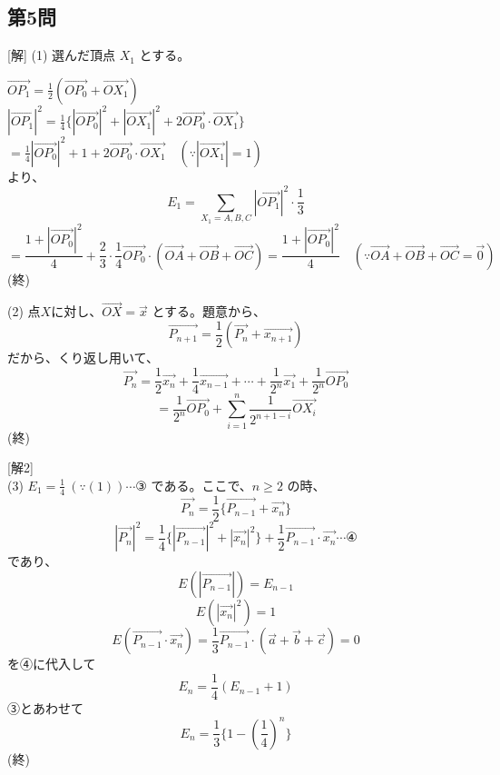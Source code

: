 \documentclass[../main.tex]{subfiles}
\begin{document}
\subsection*{第5問}
[解] (1) 選んだ頂点 $X_1$ とする。

\begin{center}
\end{center}

$\overrightarrow{OP_1} = \frac{1}{2}(\overrightarrow{OP_0} + \overrightarrow{OX_1})$ \\
$|\overrightarrow{OP_1}|^2 = \frac{1}{4}\{|\overrightarrow{OP_0}|^2 + |\overrightarrow{OX_1}|^2 + 2\overrightarrow{OP_0} \cdot \overrightarrow{OX_1}\}$ \\
$= \frac{1}{4}|\overrightarrow{OP_0}|^2 + 1 + 2\overrightarrow{OP_0} \cdot \overrightarrow{OX_1} \quad (\because |\overrightarrow{OX_1}| = 1)$ \\
より、
\[ E_1 = \sum_{X_1=A,B,C} |\overrightarrow{OP_1}|^2 \cdot \frac{1}{3} \]
\[ = \frac{1+|\overrightarrow{OP_0}|^2}{4} + \frac{2}{3} \cdot \frac{1}{4} \overrightarrow{OP_0} \cdot (\overrightarrow{OA} + \overrightarrow{OB} + \overrightarrow{OC}) = \frac{1+|\overrightarrow{OP_0}|^2}{4} \quad (\because \overrightarrow{OA} + \overrightarrow{OB} + \overrightarrow{OC} = \vec{0}) \] \hfill(終)

(2) 点$X$に対し、$\overrightarrow{OX} = \vec{x}$ とする。題意から、
\[ \overrightarrow{P_{n+1}} = \frac{1}{2}(\overrightarrow{P_n} + \overrightarrow{x_{n+1}}) \]
だから、くり返し用いて、
\[ \overrightarrow{P_n} = \frac{1}{2}\overrightarrow{x_n} + \frac{1}{4}\overrightarrow{x_{n-1}} + \cdots + \frac{1}{2^n}\overrightarrow{x_1} + \frac{1}{2^n}\overrightarrow{OP_0} \]
\[ = \frac{1}{2^n}\overrightarrow{OP_0} + \sum_{i=1}^n \frac{1}{2^{n+1-i}}\overrightarrow{OX_i} \] \hfill(終)

[解2] \\
(3) $E_1 = \frac{1}{4} \ (\because (1)) \cdots \text{③}$ である。ここで、$n \ge 2$ の時、
\[ \overrightarrow{P_n} = \frac{1}{2} \{ \overrightarrow{P_{n-1}} + \overrightarrow{x_n} \} \]
\[ |\overrightarrow{P_n}|^2 = \frac{1}{4}\{ |\overrightarrow{P_{n-1}}|^2 + |\overrightarrow{x_n}|^2 \} + \frac{1}{2}\overrightarrow{P_{n-1}} \cdot \overrightarrow{x_n} \cdots \text{④} \]
であり、
\[ E(|\overrightarrow{P_{n-1}}|) = E_{n-1} \]
\[ E(|\overrightarrow{x_n}|^2) = 1 \]
\[ E(\overrightarrow{P_{n-1}} \cdot \overrightarrow{x_n}) = \frac{1}{3}\overrightarrow{P_{n-1}} \cdot (\vec{a} + \vec{b} + \vec{c}) = 0 \]
を④に代入して
\[ E_n = \frac{1}{4} (E_{n-1} + 1) \]
③とあわせて
\[ E_n = \frac{1}{3}\{1 - \left(\frac{1}{4}\right)^n\} \] \hfill(終)
\end{document}
